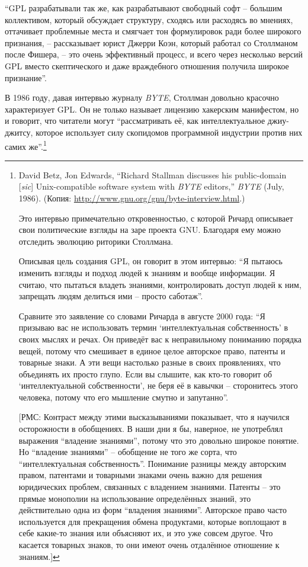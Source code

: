 \enquote{GPL разрабатывали так же, как разрабатывают свободный софт -- большим коллективом, который обсуждает структуру, сходясь или расходясь во мнениях, оттачивает проблемные места и смягчает тон формулировок ради более широкого признания, -- рассказывает юрист Джерри Коэн, который работал со Столлманом после Фишера, -- это очень эффективный процесс, и всего через несколько версий GPL вместо скептического и даже враждебного отношения получила широкое признание}.

В 1986 году, давая интервью журналу \textit{BYTE}, Столлман довольно красочно характеризует GPL. Он не только называет лицензию хакерским манифестом, но и говорит, что читатели могут \enquote{рассматривать её, как интеллектуальное джиу-джитсу, которое использует силу скопидомов программной индустрии против них самих же}.\footnote{David Betz, Jon Edwards, \enquote{Richard Stallman discusses his public-domain [\textit{sic}] Unix-compatible software system with \textit{BYTE} editors,} \textit{BYTE} (July, 1986). (Копия: \url{http://www.gnu.org/gnu/byte-interview.html}.)

Это интервью примечательно откровенностью, с которой Ричард описывает свои политические взгляды на заре проекта GNU. Благодаря ему можно отследить эволюцию риторики Столлмана.

Описывая цель создания GPL, он говорит в этом интервью: \enquote{Я пытаюсь изменить взгляды и подход людей к знаниям и вообще информации. Я считаю, что пытаться владеть знаниями, контролировать доступ людей к ним, запрещать людям делиться ими -- просто саботаж}.

Сравните это заявление со словами Ричарда в августе 2000 года: \enquote{Я призываю вас не использовать термин \enquote{интеллектуальная собственность} в своих мыслях и речах. Он приведёт вас к неправильному пониманию порядка вещей, потому что смешивает в единое целое авторское право, патенты и товарные знаки. А эти вещи настолько разные в своих проявлениях, что объединять их просто глупо. Если вы слышите, как кто-то говорит об \enquote{интеллектуальной собственности}, не беря её в кавычки -- сторонитесь этого человека, потому что его мышление смутно и запутанно}.

[РМС: Контраст между этими высказываниями показывает, что я научился осторожности в обобщениях. В наши дни я бы, наверное, не употреблял выражения \enquote{владение знаниями}, потому что это довольно широкое понятие. Но \enquote{владение знаниями} -- обобщение не того же сорта, что \enquote{интеллектуальная собственность}. Понимание разницы между авторским правом, патентами и товарными знаками очень важно для решения юридических проблем, связанных с владением знаниями. Патенты -- это прямые монополии на использование определённых знаний, это действительно одна из форм \enquote{владения знаниями}. Авторское право часто используется для прекращения обмена продуктами, которые воплощают в себе какие-то знания или объясняют их, и это уже совсем другое. Что касается товарных знаков, то они имеют очень отдалённое отношение к знаниям.]}

